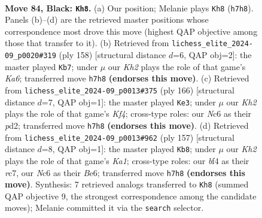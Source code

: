 \documentclass[11pt]{article}
\begin{document}
\clearpage

\begin{figure}[p]\centering
\begin{subfigure}{0.46\textwidth}\centering
\resizebox{\linewidth}{!}{%
\newchessgame
\chessboard[
  setfen={8/7k/2n5/8/2b2B2/8/5PK1/8 b - - 14 84},
  showmover=false,
  pgfstyle=straightmove, color=movearrow, markmove={h7-h8}
]}
\caption{}
\end{subfigure}\hfill
\begin{subfigure}{0.46\textwidth}\centering
\resizebox{\linewidth}{!}{%
\newchessgame
\chessboard[
  setfen={8/3B4/K7/7p/4N2k/8/8/6b1 w - - 32 80},
  showmover=false,
  pgfstyle=straightmove, color=movearrow, markmove={a6-b7}
]}
\caption{}
\end{subfigure}
\\[4pt]
\begin{subfigure}{0.46\textwidth}\centering
\resizebox{\linewidth}{!}{%
\newchessgame
\chessboard[
  setfen={8/8/8/2p5/2k2K2/8/3p4/3B4 w - - 0 84},
  showmover=false,
  pgfstyle=straightmove, color=movearrow, markmove={f4-e3}
]}
\caption{}
\end{subfigure}\hfill
\begin{subfigure}{0.46\textwidth}\centering
\resizebox{\linewidth}{!}{%
\newchessgame
\chessboard[
  setfen={k7/2R5/4b3/1K6/1P6/8/8/8 b - - 0 79},
  showmover=false,
  pgfstyle=straightmove, color=movearrow, markmove={a8-b8}
]}
\caption{}
\end{subfigure}
\caption{\textbf{Move 84, Black: \texttt{Kh8}.} (a) Our position; Melanie plays \texttt{Kh8} (\texttt{h7h8}). Panels (b)--(d) are the retrieved master positions whose correspondence most drove this move (highest QAP objective among those that transfer to it). (b) Retrieved from \texttt{lichess\_elite\_2024-09\_p0020\#319} (ply 158) [structural distance $d$=6, QAP obj=2]: the master played \texttt{Kb7}; under $\mu$ our \emph{Kh2} plays the role of that game's \emph{Ka6}; transferred move \texttt{h7h8} \textbf{(endorses this move)}. (c) Retrieved from \texttt{lichess\_elite\_2024-09\_p0013\#375} (ply 166) [structural distance $d$=7, QAP obj=1]: the master played \texttt{Ke3}; under $\mu$ our \emph{Kh2} plays the role of that game's \emph{Kf4}; cross-type roles: our \emph{N}c6 as their \emph{p}d2; transferred move \texttt{h7h8} \textbf{(endorses this move)}. (d) Retrieved from \texttt{lichess\_elite\_2024-09\_p0013\#962} (ply 157) [structural distance $d$=8, QAP obj=1]: the master played \texttt{Kb8}; under $\mu$ our \emph{Kh2} plays the role of that game's \emph{Ka1}; cross-type roles: our \emph{b}f4 as their \emph{r}c7, our \emph{N}c6 as their \emph{B}e6; transferred move \texttt{h7h8} \textbf{(endorses this move)}. Synthesis: 7 retrieved analogs transferred to \texttt{Kh8} (summed QAP objective 9, the strongest correspondence among the candidate moves); Melanie committed it via the \texttt{search} selector.}
\label{fig:thought-m167}
\end{figure}
\end{document}
